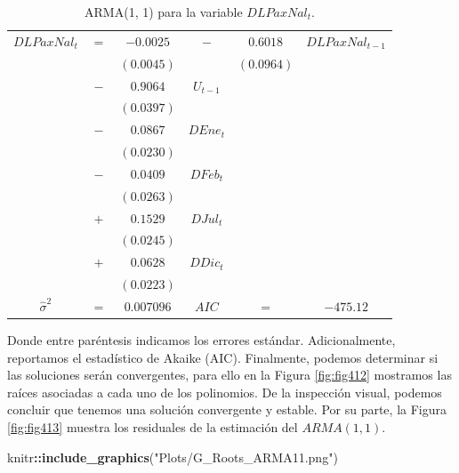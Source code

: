 \documentclass[
]{book}
\newenvironment{Shaded}{\begin{snugshade}}{\end{snugshade}}
\newcommand{\FunctionTok}[1]{\textcolor[rgb]{0.13,0.29,0.53}{\textbf{#1}}}
\newcommand{\NormalTok}[1]{#1}
\newcommand{\SpecialCharTok}[1]{\textcolor[rgb]{0.81,0.36,0.00}{\textbf{#1}}}
\newcommand{\StringTok}[1]{\textcolor[rgb]{0.31,0.60,0.02}{#1}}
\begin{document}
\begin{longtable}[]{@{}cccccc@{}}
\caption{\label{tab:ARMA01} ARMA(1, 1) para la variable \(DLPaxNal_t\).}\tabularnewline
\toprule\noalign{}
\endfirsthead
\endhead
\bottomrule\noalign{}
\endlastfoot
\(DLPaxNal_t\) & \(=\) & \(-0.0025\) & \(-\) & \(0.6018\) & \(DLPaxNal_{t-1}\) \\
& & \((0.0045)\) & & \((0.0964)\) & \\
& \(-\) & \(0.9064\) & \(U_{t-1}\) & & \\
& & \((0.0397)\) & & & \\
& \(-\) & \(0.0867\) & \(DEne_t\) & & \\
& & \((0.0230)\) & & & \\
& \(-\) & \(0.0409\) & \(DFeb_t\) & & \\
& & \((0.0263)\) & & & \\
& \(+\) & \(0.1529\) & \(DJul_t\) & & \\
& & \((0.0245)\) & & & \\
& \(+\) & \(0.0628\) & \(DDic_t\) & & \\
& & \((0.0223)\) & & & \\
\(\hat{\sigma}^2\) & \(=\) & \(0.007096\) & \(AIC\) & \(=\) & \(-475.12\) \\
\end{longtable}

Donde entre paréntesis indicamos los errores estándar. Adicionalmente, reportamos el estadístico de Akaike (AIC). Finalmente, podemos determinar si las soluciones serán convergentes, para ello en la Figura \ref{fig:fig412} mostramos las raíces asociadas a cada uno de los polinomios. De la inspección visual, podemos concluir que tenemos una solución convergente y estable. Por su parte, la Figura \ref{fig:fig413} muestra los residuales de la estimación del \(ARMA(1, 1)\).

\begin{Shaded}
\begin{Highlighting}[]
\NormalTok{knitr}\SpecialCharTok{::}\FunctionTok{include\_graphics}\NormalTok{(}\StringTok{"Plots/G\_Roots\_ARMA11.png"}\NormalTok{) }
\end{Highlighting}
\end{Shaded}
\end{document}
